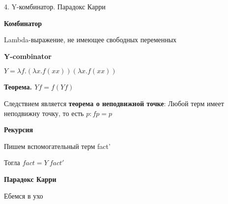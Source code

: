 \begin{para}{4. Y-комбинатор. Парадокс Карри}

\textbf{Комбинатор}

Lambda-выражение, не имеющее свободных переменных

\textbf{Y-combinator}

$Y = \lambda f.(\lambda x.f(xx))(\lambda x.f(xx))$

\textbf{Теорема. $Yf = f(Yf)$}

Следствием является \textbf{теорема о неподвижной точке}: Любой терм имеет неподвижну точку, то есть $p : fp = p$

\textbf{Рекурсия}

Пишем вспомогательный терм fact'

Тогла $fact = Y \: fact'$

\textbf{Парадокс Карри}

Ебемся в ухо

\end{para}


